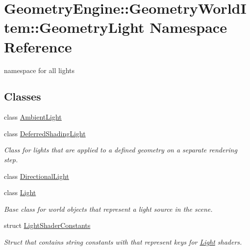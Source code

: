 \hypertarget{namespace_geometry_engine_1_1_geometry_world_item_1_1_geometry_light}{}\section{Geometry\+Engine\+::Geometry\+World\+Item\+::Geometry\+Light Namespace Reference}
\label{namespace_geometry_engine_1_1_geometry_world_item_1_1_geometry_light}


namespace for all lights  


\subsection*{Classes}
\begin{DoxyCompactItemize}
\item 
class \mbox{\hyperlink{class_geometry_engine_1_1_geometry_world_item_1_1_geometry_light_1_1_ambient_light}{Ambient\+Light}}
\item 
class \mbox{\hyperlink{class_geometry_engine_1_1_geometry_world_item_1_1_geometry_light_1_1_deferred_shading_light}{Deferred\+Shading\+Light}}
\begin{DoxyCompactList}\small\item\em Class for lights that are applied to a defined geometry on a separate rendering step. \end{DoxyCompactList}\item 
class \mbox{\hyperlink{class_geometry_engine_1_1_geometry_world_item_1_1_geometry_light_1_1_directional_light}{Directional\+Light}}
\item 
class \mbox{\hyperlink{class_geometry_engine_1_1_geometry_world_item_1_1_geometry_light_1_1_light}{Light}}
\begin{DoxyCompactList}\small\item\em Base class for world objects that represent a light source in the scene. \end{DoxyCompactList}\item 
struct \mbox{\hyperlink{struct_geometry_engine_1_1_geometry_world_item_1_1_geometry_light_1_1_light_shader_constants}{Light\+Shader\+Constants}}
\begin{DoxyCompactList}\small\item\em Struct that contains string constants with that represent keys for \mbox{\hyperlink{class_geometry_engine_1_1_geometry_world_item_1_1_geometry_light_1_1_light}{Light}} shaders. \end{DoxyCompactList}\item 

\end{DoxyCompactItemize}
